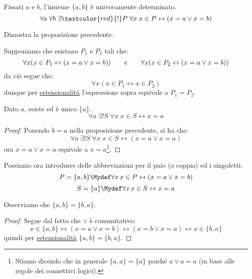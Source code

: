\documentclass[11pt]{scrartcl}
\begin{document}
\begin{proposition}
Fissati $a$ e $b$, l'insieme $\{a,b\}$ è univocamente determinato.
\[\forall a \; \forall b \; \exists\textcolor{red}{!} P \; \forall x \; x \in P \leftrightarrow (x = a \lor x = b)
	\]
\end{proposition}

\begin{exercise}
	Dimostra la proposizione precedente.
\end{exercise}

\begin{soln}
	Supponiamo che esistano $P_1$ e $P_2$ tali che:
	\[ \forall x (x \in P_1 \leftrightarrow (x = a \lor x = b)) \qquad \text e \qquad \forall x (x \in P_2 \leftrightarrow (x = a \lor x = b))
		\]
	da ciò segue che:
	\[ \forall x (x \in P_1 \leftrightarrow x \in P_2)
		\]
	dunque per \hyperref[ax2]{estensionalità} l'espressione sopra equivale a $P_1 = P_2$.
\end{soln}

\begin{proposition}
	Dato $a$, esiste ed è unico $\{a\}$.
	\[ \forall a \; \exists ! S \; \forall x \; x \in S \leftrightarrow x = a
		\]
\end{proposition}

\begin{proof}
	Ponendo $b = a$ nella proposizione precedente, si ha che:
	\[ \forall a \; \exists ! S \; \forall x \; x \in S \leftrightarrow (x = a \lor x= a)
		\]
	ora $x = a \lor x = a$ equivale a $x = a$\footnote{Stiamo dicendo che in generale $\{a,a\} = \{a\}$ poiché $a \lor a = a$ (in base alle regole dei connettivi logici).}.
\end{proof}

\begin{notation}
	Possiamo ora introdurre delle abbreviazioni per il paio (o coppia) ed i singoletti:
	\[ P = \{a,b\} \Mydef \forall x \, x \in P \leftrightarrow (x = a \lor x = b)
		\]\[ S = \{a\} \Mydef \forall x \, x \in S \leftrightarrow x = a
			\]
\end{notation}

\begin{remark}
	Osserviamo che $\{a,b\} = \{b,a\}$.
\end{remark}

\begin{proof}
	Segue dal fatto che $\lor$ è commutativo:
	\[ x \in \{a,b\} \leftrightarrow (x = a \lor x = b) \leftrightarrow (x = b \lor x = a) \leftrightarrow x \in \{b,a\}
		\]
	quindi per \hyperref[ax2]{estensionalità} $\{a,b\} = \{b,a\}$.
\end{proof}
\end{document}
